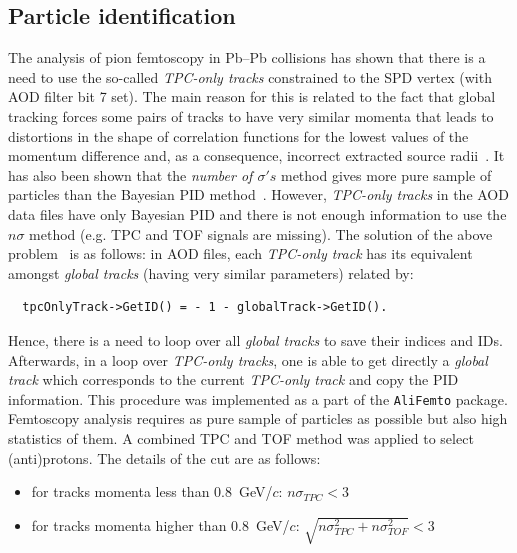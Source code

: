 \subsection{Particle identification}
The analysis of pion femtoscopy in Pb--Pb collisions has shown that there is a need to use the so-called \emph{TPC-only tracks} constrained to the SPD vertex (with AOD filter bit 7 set). The main reason for this is related to the fact that global tracking forces some pairs of tracks to have very similar momenta that leads to distortions in the shape of correlation functions for the lowest values of the momentum difference and, as a consequence, incorrect extracted source radii~\cite{ak_savannah_bug}. It has also been shown that the \emph{number of $\sigma 's$} method gives more pure sample of particles than the Bayesian PID method~\cite{lmalinin}. However, \emph{TPC-only tracks} in the AOD data files have only Bayesian PID and there is not enough information to use the $n\sigma$ method (e.g. TPC and TOF signals are missing). The solution of the above problem~\cite{CKB} is as follows: in AOD files, each \emph{TPC-only track} has its equivalent amongst \emph{global tracks} (having very similar parameters) related by:
\begin{verbatim}
  tpcOnlyTrack->GetID() = - 1 - globalTrack->GetID().
\end{verbatim}
Hence, there is a need to loop over all \emph{global tracks} to save their indices and IDs. Afterwards, in a loop over \emph{TPC-only tracks}, one is able to get directly a \emph{global track} which corresponds to the current \emph{TPC-only track} and copy the PID information. This procedure was implemented as a part of the \verb|AliFemto| package. Femtoscopy analysis requires as pure sample of particles as possible but also high statistics of them. A combined TPC and TOF method was applied to select (anti)protons. The details of the cut are as follows:
\begin{itemize}
\item for tracks momenta less than $0.8$~GeV/$c$: $n{\sigma}_{TPC} < 3$
\item for tracks momenta higher than $0.8$~GeV/$c$: $\sqrt{{n{\sigma}^2_{TPC}+n{\sigma}^2_{TOF}}} < 3$
\end{itemize}

